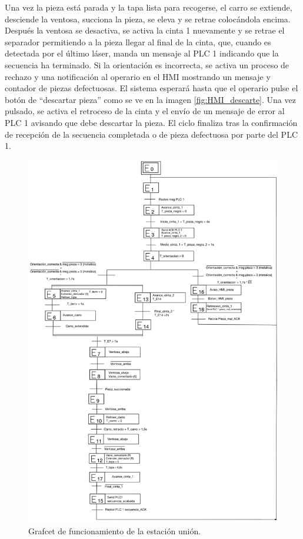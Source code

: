 Una vez la pieza está parada y la tapa lista para recogerse, el carro se extiende, desciende la ventosa, succiona la pieza, se eleva y se retrae colocándola encima. Después la ventosa se desactiva, se activa la cinta 1 nuevamente y se retrae el separador permitiendo a la pieza llegar al final de la cinta, que, cuando es detectada por el último láser, manda un mensaje al PLC 1 indicando que la secuencia ha terminado. Si la orientación es incorrecta, se activa un proceso de rechazo y una notificación al operario en el HMI mostrando un mensaje y contador de piezas defectuosas. El sistema esperará hasta que el operario pulse el botón de “descartar pieza” como se ve en la imagen \ref{fig:HMI_descarte}. Una vez pulsado, se activa el retroceso de la cinta y el envío de un mensaje de error al PLC 1 avisando que debe descartar la pieza. El ciclo finaliza tras la confirmación de recepción de la secuencia completada o de pieza defectuosa por parte del PLC 1.
 
 \begin{figure}[h!]
  \includegraphics[width=15cm]{figs/grafcet_union}
  \caption{\centering Grafcet de funcionamiento de la estación unión.}
  \label{fig:grafcet_union}
\end{figure}

